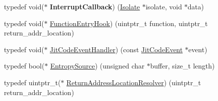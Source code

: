 \begin{DoxyCompactItemize}
\item 
\hypertarget{namespacev8_af07fcf2ef61237b7ba67242700b6a875}{}typedef void($\ast$ {\bfseries Interrupt\+Callback}) (\hyperlink{classv8_1_1_isolate}{Isolate} $\ast$isolate, void $\ast$data)\label{namespacev8_af07fcf2ef61237b7ba67242700b6a875}

\item 
typedef void($\ast$ \hyperlink{namespacev8_aaf07fb6bb13f295da3c6568938b7dec5}{Function\+Entry\+Hook}) (uintptr\+\_\+t function, uintptr\+\_\+t return\+\_\+addr\+\_\+location)
\item 
typedef void($\ast$ \hyperlink{namespacev8_a39243bc91e63d64d111452fdb98c4733}{Jit\+Code\+Event\+Handler}) (const \hyperlink{structv8_1_1_jit_code_event}{Jit\+Code\+Event} $\ast$event)
\item 
typedef bool($\ast$ \hyperlink{namespacev8_ab699f4bbbb56350e6e915682e420fcdc}{Entropy\+Source}) (unsigned char $\ast$buffer, size\+\_\+t length)
\item 
typedef uintptr\+\_\+t($\ast$ \hyperlink{namespacev8_a8ce54c75241be41ff6a25e9944eefd2a}{Return\+Address\+Location\+Resolver}) (uintptr\+\_\+t return\+\_\+addr\+\_\+location)
\end{DoxyCompactItemize}
